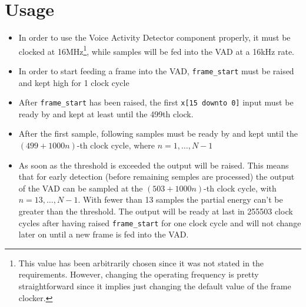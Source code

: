 \section{Usage}
\begin{itemize}
  \item In order to use the Voice Activity Detector component properly,
        it must be clocked at 16\si{\mega\hertz}\footnote{This value has been
        arbitrarily chosen since it was not stated in the requirements. However,
        changing the operating frequency is pretty straightforward since it implies
        just changing the default value of the frame clocker.}, while samples will be fed
        into the VAD at a 16\si{\kilo\hertz} rate.
  \item In order to start feeding a frame into the VAD,
        \texttt{frame\_start} must be raised and kept high for 1 clock cycle
  \item After \texttt{frame\_start} has been raised,
        the first \texttt{x[15 downto 0]} input must be ready by
        and kept at least until the 499th clock.
  \item After the first sample, following samples must be ready by
        and kept until the $(499 + 1000n)$-th clock cycle, where
        $n = 1, \dots, N - 1$
  \item As soon as the threshold is exceeded the output will be raised.
        This means that for early detection (before remaining semples are
        processed) the output of the VAD can be sampled at the
        $(503 + 1000n)$-th clock cycle, with $n = 13, \dots, N - 1$. With fewer
        than 13 samples the partial energy can't be greater than the threshold.
        The output will be ready at last in 255503 clock cycles after having
        raised \texttt{frame\_start} for one clock cycle and will not change
        later on until a new frame is fed into the VAD.
\end{itemize}
